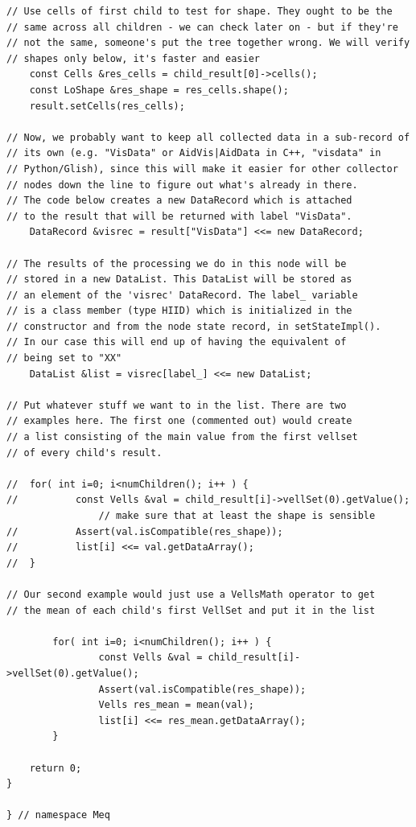 \documentclass[10pt]{article}
\begin{document}
\begin{verbatim}
// Use cells of first child to test for shape. They ought to be the 
// same across all children - we can check later on - but if they're 
// not the same, someone's put the tree together wrong. We will verify
// shapes only below, it's faster and easier
	const Cells &res_cells = child_result[0]->cells();
	const LoShape &res_shape = res_cells.shape();
	result.setCells(res_cells);

// Now, we probably want to keep all collected data in a sub-record of 
// its own (e.g. "VisData" or AidVis|AidData in C++, "visdata" in 
// Python/Glish), since this will make it easier for other collector 
// nodes down the line to figure out what's already in there.
// The code below creates a new DataRecord which is attached
// to the result that will be returned with label "VisData".
	DataRecord &visrec = result["VisData"] <<= new DataRecord;

// The results of the processing we do in this node will be
// stored in a new DataList. This DataList will be stored as
// an element of the 'visrec' DataRecord. The label_ variable
// is a class member (type HIID) which is initialized in the 
// constructor and from the node state record, in setStateImpl().
// In our case this will end up of having the equivalent of
// being set to "XX" 
	DataList &list = visrec[label_] <<= new DataList;

// Put whatever stuff we want to in the list. There are two
// examples here. The first one (commented out) would create
// a list consisting of the main value from the first vellset 
// of every child's result.

//	for( int i=0; i<numChildren(); i++ ) {
//    		const Vells &val = child_result[i]->vellSet(0).getValue();
                // make sure that at least the shape is sensible
//    		Assert(val.isCompatible(res_shape));
//    		list[i] <<= val.getDataArray();
//	}

// Our second example would just use a VellsMath operator to get
// the mean of each child's first VellSet and put it in the list

        for( int i=0; i<numChildren(); i++ ) {
                const Vells &val = child_result[i]->vellSet(0).getValue();
                Assert(val.isCompatible(res_shape));
                Vells res_mean = mean(val);
                list[i] <<= res_mean.getDataArray();
        }

 	return 0;
}

} // namespace Meq
\end{verbatim}
\end{document}
